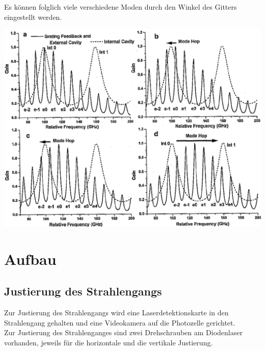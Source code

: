 \documentclass[captions=tableheading]{scrartcl}
\let\oldsection\section
\renewcommand\section{\clearpage\oldsection}
\begin{document}
Es können folglich viele verschiedene Moden durch den Winkel des Gitters eingestellt werden. 
\begin{center}
	\includegraphics[width=15cm]{images/gainmulti.png}
	\label{fig:gainmulti}
\end{center}
 
\newpage
\section{Aufbau}

\subsection{Justierung des Strahlengangs}
Zur Justierung des Strahlengangs wird eine Laserdetektionskarte in den Strahlengang gehalten und eine Videokamera auf die Photozelle gerichtet. \\
Zur Justierung des Strahlenganges sind zwei Drehschrauben am Diodenlaser vorhanden, jeweils für die horizontale und die vertikale Justierung.
 
\end{document}

